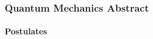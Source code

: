 \begin{frame}
    \frametitle{Quantum Mechanics Abstract}
    \framesubtitle{Postulates}
    
\end{frame}